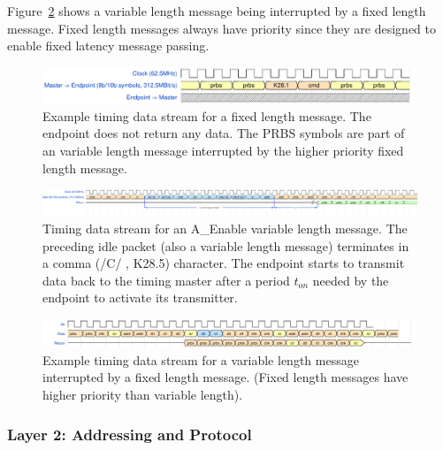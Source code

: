 \documentclass{dune}
\begin{document}
Figure~\ref{fig:wave-variable-length} shows a variable length message being interrupted by a fixed length message. Fixed length messages always have priority since they are designed to enable fixed latency message passing.

\begin{landscape}
\begin{figure}[h]
	\centering
	\includegraphics[width=\linewidth]{dts_sp-fixed-length-message.pdf}
	\caption{Example timing data stream for a fixed length message. The endpoint does not return any data. The PRBS symbols are part of an variable length message interrupted by the higher priority fixed length message.}
	\label{fig:wave-fixed-length}
\end{figure}

\begin{figure}[h]
	\centering
	\includegraphics[width=\linewidth]{dts_sp-variable-length-message-a_enable_ed.pdf}
	\caption{Timing data stream for an A\_Enable variable length message. The preceding idle packet (also a variable length message) terminates in a comma (/C/ , K28.5) character. The endpoint starts to transmit data back to the timing master after a period $t_{\mathrm on}$ needed by the endpoint to activate its transmitter.  
	}
	\label{fig:wave-variable-length}
\end{figure}

\begin{figure}[h]
	\centering
	\includegraphics[width=\linewidth]{timing_protocol_wavedrom_01.pdf}
	\caption{Example timing data stream for a variable length message interrupted by a fixed length message. (Fixed length messages have higher priority than variable length).}
	\label{fig:wave-interupted-message}
\end{figure}
\end{landscape}


\subsubsection{Layer 2: Addressing and Protocol}
\label{section:addressing_protocol}
\end{document}
